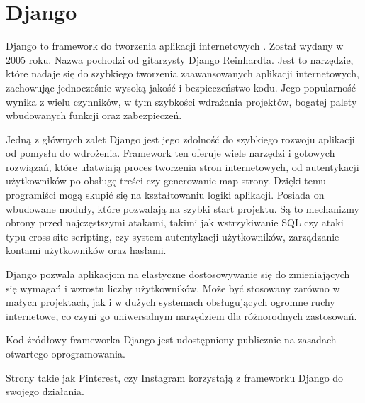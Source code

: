 \section{Django}

Django to framework do tworzenia aplikacji internetowych \cite{djangooverview}. Został wydany w 2005 roku. Nazwa pochodzi od gitarzysty Django Reinhardta.
Jest to narzędzie, które nadaje się do szybkiego tworzenia zaawansowanych aplikacji internetowych, zachowując jednocześnie wysoką jakość i bezpieczeństwo kodu.
Jego popularność wynika z wielu czynników, w tym szybkości wdrażania projektów, bogatej palety wbudowanych funkcji oraz zabezpieczeń.

Jedną z głównych zalet Django jest jego zdolność do szybkiego rozwoju aplikacji od pomysłu do wdrożenia.
Framework ten oferuje wiele narzędzi i gotowych rozwiązań, które ułatwiają proces tworzenia stron internetowych, od autentykacji użytkowników po obsługę treści czy generowanie map strony.
Dzięki temu programiści mogą skupić się na kształtowaniu logiki aplikacji.
Posiada on wbudowane moduły, które pozwalają na szybki start projektu.
Są to mechanizmy obrony przed najczęstszymi atakami, takimi jak wstrzykiwanie SQL czy ataki typu cross-site scripting, czy system autentykacji użytkowników, zarządzanie kontami użytkowników oraz hasłami.

Django pozwala aplikacjom na elastyczne dostosowywanie się do zmieniających się wymagań i wzrostu liczby użytkowników.
Może być stosowany zarówno w małych projektach, jak i w dużych systemach obsługujących ogromne ruchy internetowe, co czyni go uniwersalnym narzędziem dla różnorodnych zastosowań.

Kod źródłowy frameworka Django jest udostępniony publicznie na zasadach otwartego oprogramowania.

Strony takie jak Pinterest, czy Instagram korzystają z frameworku Django do swojego działania.
